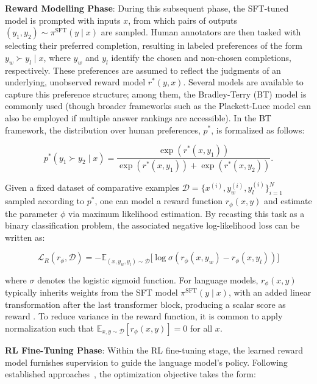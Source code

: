 \textbf{Reward Modelling Phase}: During this subsequent phase, the SFT-tuned model is prompted with inputs $x$, from which pairs of outputs $(y_1, y_2)\sim \pi^\text{SFT}(y \mid x)$ are sampled. Human annotators are then tasked with selecting their preferred completion, resulting in labeled preferences of the form $y_w\succ y_l \mid x$, where $y_w$ and $y_l$ identify the chosen and non-chosen completions, respectively. These preferences are assumed to reflect the judgments of an underlying, unobserved reward model $r^*(y, x)$. Several models are available to capture this preference structure; among them, the Bradley-Terry (BT) model \cite{bradley1952rankanalysis} is commonly used (though broader frameworks such as the Plackett-Luce model \citep{plackett1975analysis, luce2012individual} can also be employed if multiple answer rankings are accessible). In the BT framework, the distribution over human preferences, $p^*$, is formalized as follows:

\begin{equation}\label{eq:bradley-terry}
    p^*(y_1\succ y_2 \mid x)=\frac{\exp\left(r^*(x, y_1)\right)}{\exp\left(r^*(x, y_1)\right) + \exp\left(r^*(x, y_2)\right)}.
\end{equation}

Given a fixed dataset of comparative examples $\mathcal{D}=\bigl\{x^{(i)}, y_w^{(i)}, y_l^{(i)}\bigr\}_{i=1}^N$ sampled according to $p^*$, one can model a reward function $r_{\phi}(x, y)$ and estimate the parameter $\phi$ via maximum likelihood estimation. By recasting this task as a binary classification problem, the associated negative log-likelihood loss can be written as:

\begin{equation}\label{eq:reward_model}
    \mathcal{L}_R(r_{\phi}, \mathcal{D}) = -\mathbb{E}_{(x, y_w, y_l)\sim \mathcal{D}}\bigl[\log \sigma(r_{\phi}(x, y_w)- r_{\phi}(x, y_l))\bigr]
\end{equation}

where $\sigma$ denotes the logistic sigmoid function. For language models, $r_{\phi}(x, y)$ typically inherits weights from the SFT model $\pi^\text{SFT}(y \mid x)$, with an added linear transformation after the last transformer block, producing a scalar score as reward \cite{ziegler2020finetuning}. To reduce variance in the reward function, it is common to apply normalization such that $\mathbb{E}_{x,y\sim \mathcal{D}}\left[r_\phi(x, y)\right] = 0$ for all $x$.

\textbf{RL Fine-Tuning Phase}: Within the RL fine-tuning stage, the learned reward model furnishes supervision to guide the language model’s policy. Following established approaches~\citep{jaques2017sequence, jaques2020human}, the optimization objective takes the form:

